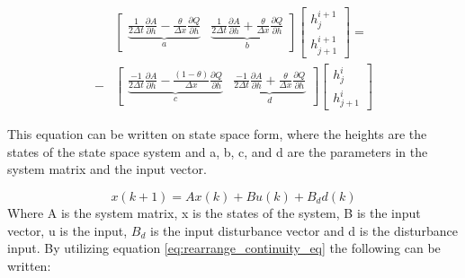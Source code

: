\begin{equation}\label{eq:rearrange_continuity_eq}
\begin{aligned}
	&\begin{bmatrix}
		\underbrace{\frac{1}{2\Delta t}\frac{\partial A}{\partial h}-\frac{\theta}{\Delta x}\frac{\partial Q}{\partial h}}_{a} & \underbrace{\frac{1}{2\Delta t}\frac{\partial A}{\partial h}+\frac{\theta}{\Delta x}\frac{\partial Q}{\partial h}}_{b} 
	\end{bmatrix}
	\begin{bmatrix}
		h_{j}^{i+1} \\
		h_{j+1}^{i+1}
	\end{bmatrix}
	= \\ -
	&\begin{bmatrix}
		\underbrace{\frac{-1}{2\Delta t}\frac{\partial A}{\partial h}-\frac{(1-\theta)}{\Delta x}\frac{\partial Q}{\partial h}}_{c} & \underbrace{\frac{-1}{2\Delta t}\frac{\partial A}{\partial h}+\frac{\theta}{\Delta x}\frac{\partial Q}{\partial h}}_{d} 
	\end{bmatrix}
	\begin{bmatrix}
		h_{j}^{i} \\
		h_{j+1}^{i}
	\end{bmatrix}
	\end{aligned}
\end{equation}

This equation can be written on state space form, where the heights are the states of the state space system and a, b, c, and d are the parameters in the system matrix and the input vector. %

\begin{equation}
	x(k+1) = Ax(k) + Bu(k) + B_dd(k)
\end{equation}
Where A is the system matrix, x is the states of the system, B is the input vector, u is the input, $B_d$ is the input disturbance vector and d is the disturbance input. By utilizing equation \ref{eq:rearrange_continuity_eq} the following can be written:

